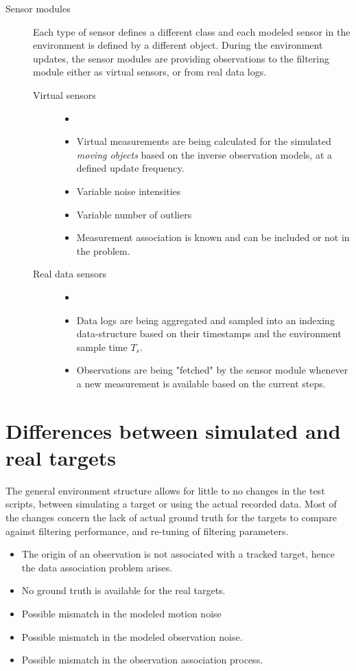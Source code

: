 \begin{description}
	\item[Sensor modules] Each type of sensor defines a different class and each modeled sensor in the environment is defined by a different object. During the environment updates, the sensor modules are providing observations to the filtering module either as virtual sensors, or from real data logs.
	\begin{description}
		\item[Virtual sensors]
		\begin{itemize}
			\item[]
			\item Virtual measurements are being calculated for the simulated \emph{moving objects} based on the inverse observation models, at a defined update frequency.
			\item Variable noise intensities
			\item Variable number of outliers
			\item Measurement association is known and can be included or not in the problem.
		\end{itemize}
		\item[Real data sensors]
				\begin{itemize}
					\item[]
					\item Data logs are being aggregated and sampled into an indexing data-structure based on their timestamps and the environment sample time $T_s$.
					\item Observations are being "fetched" by the sensor module whenever a new measurement is available based on the current steps.
				\end{itemize}
		
	\end{description}
\end{description}

	
	
\section{Differences between simulated and real targets}

The general environment structure allows for little to no changes in the test scripts, between simulating a target or using the actual recorded data. Most of the changes concern the lack of actual ground truth for the targets to compare against filtering performance, and re-tuning of filtering parameters.
\begin{itemize}
	\item  The origin of an observation is not associated with a tracked target, hence the data association problem arises.
	\item No ground truth is available for the real targets.
	\item Possible mismatch in the modeled motion noise 
	\item Possible mismatch in the modeled observation noise.
	\item Possible mismatch in the observation association process.
\end{itemize}

